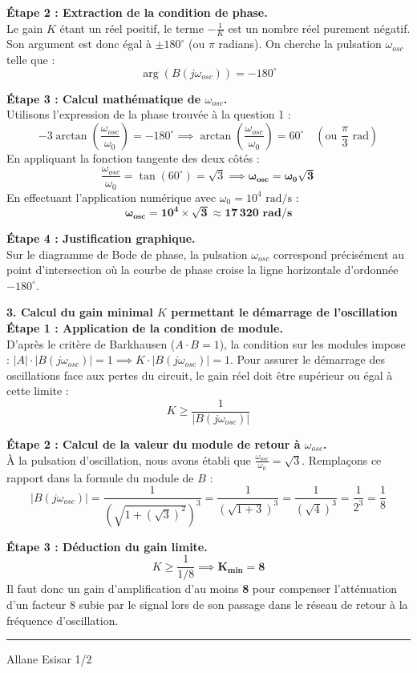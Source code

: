 \documentclass[11pt, a4paper]{article}
\begin{document}
\begin{minipage}{\textwidth}
{\textbf{Étape 2 : Extraction de la condition de phase.}\\
Le gain $K$ étant un réel positif, le terme $-\frac{1}{K}$ est un nombre réel purement négatif. Son argument est donc égal à $\pm 180^\circ$ (ou $\pi$ radians). On cherche la pulsation $\omega_{osc}$ telle que :
$$ \arg(B(j\omega_{osc})) = -180^\circ $$

\textbf{Étape 3 : Calcul mathématique de $\omega_{osc}$.}\\
Utilisons l'expression de la phase trouvée à la question 1 :
$$ -3 \arctan\left(\frac{\omega_{osc}}{\omega_0}\right) = -180^\circ \implies \arctan\left(\frac{\omega_{osc}}{\omega_0}\right) = 60^\circ \quad \left(\text{ou } \frac{\pi}{3} \text{ rad}\right) $$
En appliquant la fonction tangente des deux côtés :
$$ \frac{\omega_{osc}}{\omega_0} = \tan(60^\circ) = \sqrt{3} \implies \mathbf{\omega_{osc} = \omega_0\sqrt{3}} $$
En effectuant l'application numérique avec $\omega_0 = 10^4 \text{ rad/s}$ :
$$ \mathbf{\omega_{osc} = 10^4 \times \sqrt{3} \approx 17\,320 \text{ rad/s}} $$

\textbf{Étape 4 : Justification graphique.}\\
Sur le diagramme de Bode de phase, la pulsation $\omega_{osc}$ correspond précisément au point d'intersection où la courbe de phase croise la ligne horizontale d'ordonnée $-180^\circ$.

\vspace{0.3cm}
\textbf{3. Calcul du gain minimal $K$ permettant le démarrage de l'oscillation}\\
\textbf{Étape 1 : Application de la condition de module.}\\
D'après le critère de Barkhausen ($A \cdot B = 1$), la condition sur les modules impose : $|A| \cdot |B(j\omega_{osc})| = 1 \implies K \cdot |B(j\omega_{osc})| = 1$. Pour assurer le démarrage des oscillations face aux pertes du circuit, le gain réel doit être supérieur ou égal à cette limite :
$$ K \ge \frac{1}{|B(j\omega_{osc})|} $$

\textbf{Étape 2 : Calcul de la valeur du module de retour à $\omega_{osc}$.}\\
À la pulsation d'oscillation, nous avons établi que $\frac{\omega_{osc}}{\omega_0} = \sqrt{3}$. Remplaçons ce rapport dans la formule du module de $B$ :
$$ |B(j\omega_{osc})| = \frac{1}{\left(\sqrt{1 + (\sqrt{3})^2}\right)^3} = \frac{1}{\left(\sqrt{1 + 3}\right)^3} = \frac{1}{(\sqrt{4})^3} = \frac{1}{2^3} = \frac{1}{8} $$

\textbf{Étape 3 : Déduction du gain limite.}\\
$$ K \ge \frac{1}{1/8} \implies \mathbf{K_{min} = 8} $$
Il faut donc un gain d'amplification d'au moins \textbf{8} pour compenser l'atténuation d'un facteur 8 subie par le signal lors de son passage dans le réseau de retour à la fréquence d'oscillation.
}
\end{minipage}

\vfill
\hrule
\vspace{0.1cm}
\noindent
Allane \hfill Esisar \hfill 1/2
\end{document}
